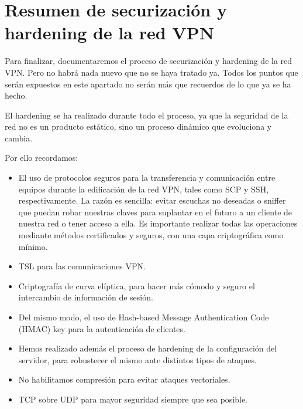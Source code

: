 \documentclass[a4paper, 11pt, titlepage]{article}
\begin{document}
\section{Resumen de securización y hardening de la red VPN}

    Para finalizar, documentaremos el proceso de securización y hardening de la red VPN. Pero
    no habrá nada nuevo que no se haya tratado ya. Todos los puntos que serán expuestos en este 
    apartado no serán más que recuerdos de lo que ya se ha hecho. 

    El hardening se ha realizado durante todo el proceso, ya que la seguridad de la red no es 
    un producto estático, sino un proceso dinámico que evoluciona y cambia.

    Por ello recordamos:
    
    \begin{itemize}
        \item El uso de protocolos seguros para la transferencia y comunicación entre equipos
        durante la edificación de la red VPN, tales como SCP y SSH, respectivamente. La razón 
        es sencilla: evitar escuchas no deseadas o sniffer que puedan robar nuestras claves
        para suplantar en el futuro a un cliente de nuestra red o tener acceso a ella. 
        Es importante realizar todas las operaciones mediante métodos certificados y seguros, 
        con una capa criptográfica como mínimo.
        \item TSL para las comunicaciones VPN.
        \item Criptografía de curva elíptica, para hacer más cómodo y seguro el intercambio de
        información de sesión.
        \item Del mismo modo, el uso de Hash-based Message Authentication Code (HMAC) key para 
        la autenticación de clientes.
        \item Hemos realizado además el proceso de hardening de la configuración del servidor,
        para robustecer el mismo ante distintos tipos de ataques.
        \item No habilitamos compresión para evitar ataques vectoriales.
        \item TCP sobre UDP para mayor seguridad siempre que sea posible.
    \end{itemize}
    
\end{document}
